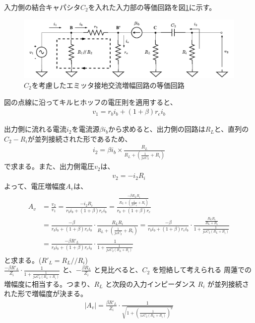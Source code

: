 入力側の結合キャパシタ$C_2$を入れた入力部の等価回路を図\ref{c2}に示す。
\begin{figure}[htbp]
  \begin{center}
  \includegraphics[width=0.8\linewidth]{img/50.pdf}
  \caption{$C_2$を考慮したエミッタ接地交流増幅回路の等価回路}
  \label{c2}
  \end{center}
\end{figure}
図の点線に沿ってキルヒホッフの電圧則を適用すると、
\begin{align}
  v_1 = r_bi_b+(1+\beta)r_ei_b  
\end{align}

出力側に流れる電流$i_2$を電流源$\beta i_b$から求めると、出力側の回路は$R_L$と、直列の$C_2-R_i$が並列接続された形であるため、\\
\begin{align}
  i_2 = \beta i_b \times \frac{R_L}{R_L+(\frac{1}{j\omega C_2}+R_i)}
\end{align}
で求まる。また、出力側電圧$v_2$は、
\begin{align}
  v_2 = - i_2R_i
\end{align}
よって、電圧増幅度$A_v$は、
\begin{align}
\begin{aligned}
  A_v & = \frac{v_2}{v_1} = \frac{-i_2R_i}{r_bi_b+(1+\beta)r_ei_b} = \frac{\frac{-\beta R_LR_i}{R_L+(\frac{1}{j\omega C_2}+R_i)}}{r_b+(1+\beta)r_e}\\
  & = \frac{-\beta}{r_bi_b+(1+\beta)r_ei_b} \cdot \frac{R_LR_i}{R_L+(\frac{1}{j\omega C_2}+R_i)} = \frac{-\beta}{r_bi_b+(1+\beta)r_ei_b} \cdot \frac{\frac{R_LR_i}{R_L+R_i}}{1+\frac{1}{j\omega C_2(R_L+R_i)}}\\
  & = \frac{-\beta R'_L}{r_bi_b+(1+\beta)r_ei_b} \cdot \frac{1}{1+\frac{1}{j\omega C_2(R_L+R_i)}}
\end{aligned}
\end{align}
と求まる。($R'_L = R_L//R_i$)\\
$\frac{-\beta R'_L}{Z_i} \cdot \frac{1}{1+\frac{1}{j\omega C_2(R_L+R_i)}}$ と、$-\frac{\beta R_L}{Z_i}$ と見比べると、$C_2$ を短絡して考えられる 周蓮での増幅度に相当する。つまり、$R_L$ と次段の入力インピーダンス $R_i$ が並列接続された形で増幅度が決まる。
\begin{align}
  |A_v| = \frac{\beta R'_L}{Z_i} \cdot \frac{1}{\sqrt{1+(\frac{1}{(\omega C_2(R_L+R_i)})^2}}  
\end{align}

